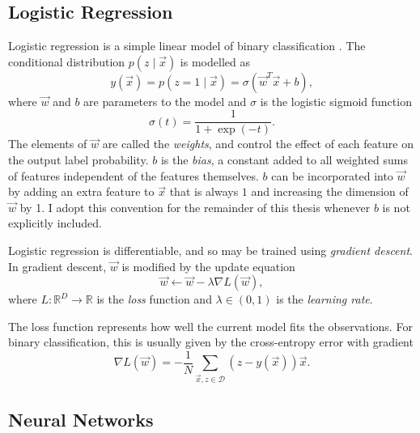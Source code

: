     \subsection{Logistic Regression}
    \label{sec:logistic-regression}

        Logistic regression is a simple linear model of binary classification
        \citep{bishop06}. The conditional distribution $p(z \mid \vec x)$ is
        modelled as
        \begin{equation}
            \label{eq:logistic-regression}
            y(\vec x) = p(z = 1 \mid \vec x) = \sigma(\vec w^T \vec x + b),
        \end{equation}
        where $\vec w$ and $b$ are parameters to the model and $\sigma$ is the
        logistic sigmoid function
        \[
            \sigma(t) = \frac{1}{1 + \exp(-t)}.
        \]
        The elements of $\vec w$ are called the \emph{weights}, and control the
        effect of each feature on the output label probability. $b$ is the
        \emph{bias}, a constant added to all weighted sums of features
        independent of the features themselves. $b$ can be incorporated into
        $\vec w$ by adding an extra feature to $\vec x$ that is always $1$ and
        increasing the dimension of $\vec w$ by 1. I adopt this convention for
        the remainder of this thesis whenever $b$ is not explicitly included.

        Logistic regression is differentiable, and so may be trained using
        \emph{gradient descent}. In gradient descent, $\vec w$ is modified by
        the update equation
        \[
            \vec w \leftarrow \vec w - \lambda \nabla L(\vec w),
        \]
        where $L : \mathbb{R}^D \to \mathbb{R}$ is the \emph{loss} function and
        $\lambda \in (0, 1)$ is the \emph{learning rate}.

        The loss function represents how well the current model fits the
        observations. For binary classification, this is usually given by the
        cross-entropy error with gradient \citep{bishop06}
        \[
            \nabla L(\vec w) = -\frac{1}{N}
                \sum_{\vec x, z \in \mathcal D} \left(z - y(\vec x)\right) \vec x.
        \]

    \subsection{Neural Networks}
    \label{sec:neural-networks}

